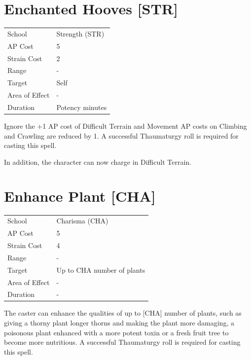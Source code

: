 \documentclass[11pt,a4paper,twocolumn]{book}
\begin{document}
\section*{Enchanted Hooves [STR]}
{
	\begin{tabu} to 75mm{| X[l,4] | X[l,7] |}
		\hline
		School 			& Strength (STR) 	\\
        AP Cost	      	& 5 				\\
        Strain Cost     & 2 				\\
        Range     		& - 				\\
        Target      	& Self 				\\
        Area of Effect  & - 	 			\\
        Duration     	& Potency minutes 	\\ \hline
	\end{tabu}
		
}

\medskip

Ignore the +1 AP cost of Difficult Terrain and Movement AP costs on Climbing and Crawling are reduced by 1. A successful Thaumaturgy roll is required for casting this spell.

In addition, the character can now charge in Difficult Terrain.


\section*{Enhance Plant [CHA]}
{
	\begin{tabu} to 75mm{| X[l,4] | X[l,7] |}
		\hline
		School 			& Charisma (CHA) 	\\
        AP Cost	      	& 5 				\\
        Strain Cost     & 4 				\\
        Range     		& - 				\\
        Target      	& Up to CHA number of plants 				\\
        Area of Effect  & - 	 			\\
        Duration     	& - 	\\ \hline
	\end{tabu}
		
}

\medskip

The caster can enhance the qualities of up to [CHA] number of plants, such as giving a thorny plant longer thorns and making the plant more damaging, a poisonous plant enhanced with a more potent toxin or a fresh fruit tree to become more nutritious.
A successful Thaumaturgy roll is required for casting this spell.
\end{document}
